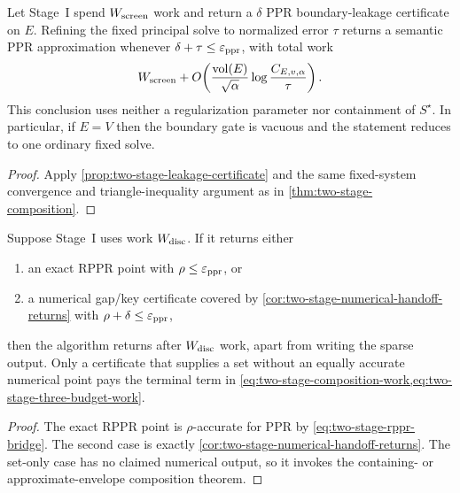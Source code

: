 \begin{corollary}
\label{cor:two-stage-leakage-composition}
Let Stage~I spend $W_{\rm screen}$ work and return a $\delta$ PPR
boundary-leakage certificate on $E$.  Refining the fixed principal solve to
normalized error $\tau$ returns a semantic PPR approximation whenever
$\delta+\tau\leq\varepsilon_{\mathrm{ppr}}$, with total work
\begin{equation}
 W_{\rm screen}
 +O\!\left(
   \frac{\operatorname{vol}(E)}{\sqrt\alpha}
   \log\frac{C_{E,v,\alpha}}{\tau}
 \right).
 \label{eq:two-stage-leakage-composition-work}
\end{equation}
This conclusion uses neither a regularization parameter nor containment of
$S^\star$.  In particular, if $E=V$ then the boundary gate is vacuous and
the statement reduces to one ordinary fixed solve.
\end{corollary}

\begin{proof}
Apply \cref{prop:two-stage-leakage-certificate} and the same fixed-system
convergence and triangle-inequality argument as in
\cref{thm:two-stage-composition}.
\end{proof}

\begin{theorem}
\label{thm:two-stage-screen-or-solve}
Suppose Stage~I uses work $W_{\rm disc}$.  If it returns either
\begin{enumerate}[leftmargin=2.2em]
\item an exact RPPR point with $\rho\leq\varepsilon_{\mathrm{ppr}}$, or
\item a numerical gap/key certificate covered by
  \cref{cor:two-stage-numerical-handoff-returns} with
  $\rho+\delta\leq\varepsilon_{\mathrm{ppr}}$,
\end{enumerate}
then the algorithm returns after $W_{\rm disc}$ work, apart from writing the
sparse output.  Only a certificate that supplies a set without an equally
accurate numerical point pays the terminal term in
\cref{eq:two-stage-composition-work,eq:two-stage-three-budget-work}.
\end{theorem}

\begin{proof}
The exact RPPR point is $\rho$-accurate for PPR by
\cref{eq:two-stage-rppr-bridge}.  The second case is exactly
\cref{cor:two-stage-numerical-handoff-returns}.  The set-only case has no
claimed numerical output, so it invokes the containing- or
approximate-envelope composition theorem.
\end{proof}


